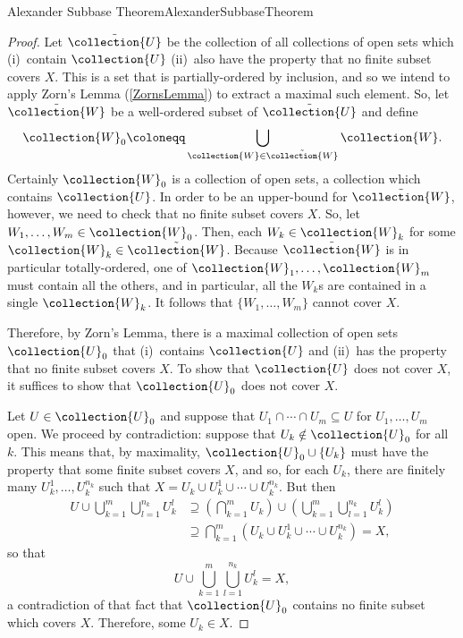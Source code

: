 \begin{thm}{Alexander Subbase Theorem}{AlexanderSubbaseTheorem}
\begin{proof}
Let $\tilde{\collection{U}}$ be the collection of all collections of open sets which (i)~contain $\collection{U}$ (ii)~also have the property that no finite subset covers $X$.  This is a set that is partially-ordered by inclusion, and so we intend to apply Zorn's Lemma (\cref{ZornsLemma}) to extract a maximal such element.  So, let $\tilde{\collection{W}}$ be a well-ordered subset of $\tilde{\collection{U}}$ and define
\begin{equation}
\collection{W}_0\coloneqq \bigcup _{\collection{W}\in \tilde{\collection{W}}}\collection{W}.
\end{equation}
Certainly $\collection{W}_0$ is a collection of open sets, a collection which contains $\collection{U}$.  In order to be an upper-bound for $\tilde{\collection{W}}$, however, we need to check that no finite subset covers $X$.  So, let $W_1,\ldots ,W_m\in \collection{W}_0$.  Then, each $W_k\in \collection{W}_k$ for some $\collection{W}_k\in \tilde{\collection{W}}$.  Because $\tilde{\collection{W}}$ is in particular totally-ordered, one of $\collection{W}_1,\ldots ,\collection{W}_m$ must contain all the others, and in particular, all the $W_k$s are contained in a single $\collection{W}_k$.  It follows that $\{ W_1,\ldots ,W_m\}$ cannot cover $X$.

Therefore, by Zorn's Lemma, there is a maximal collection of open sets $\collection{U}_0$ that (i)~contains $\collection{U}$ and (ii)~has the property that no finite subset covers $X$.  To show that $\collection{U}$ does not
cover $X$, it suffices to show that $\collection{U}_0$ does not cover $X$.

Let $U\in \collection{U}_0$ and suppose that $U_1\cap \cdots \cap U_m\subseteq U$ for $U_1,\ldots ,U_m$ open.  We proceed by contradiction:  suppose that $U_k\notin \collection{U}_0$ for all $k$.  This means that, by maximality, $\collection{U}_0\cup \{ U_k\}$ must have the property that some finite subset covers $X$, and so, for each $U_k$, there are finitely many $U_k^1,\ldots ,U_k^{n_k}$ such that $X=U_k\cup U_k^1\cup \cdots \cup U_k^{n_k}$.  But then
\begin{equation}
\begin{split}
U\cup \bigcup _{k=1}^m\bigcup _{l=1}^{n_k}U_k^l & \supseteq \left( \bigcap _{k=1}^mU_k\right) \cup \left( \bigcup _{k=1}^m\bigcup _{l=1}^{n_k}U_k^l\right) \\
& \supseteq \bigcap _{k=1}^m\left( U_k\cup U_k^1\cup \cdots \cup U_k^{n_k}\right) =X,
\end{split}
\end{equation}
so that
\begin{equation}
U\cup \bigcup _{k=1}^m\bigcup _{l=1}^{n_k}U_k^l=X,
\end{equation}
a contradiction of that fact that $\collection{U}_0$ contains no finite subset which covers $X$.  Therefore, some $U_k\in X$.


\end{proof}
\end{thm}
